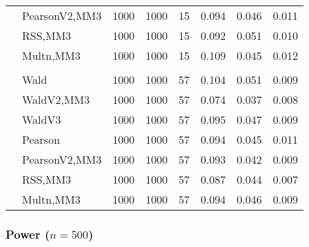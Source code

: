 \documentclass[
]{article}
\begin{document}
\begin{table}[H]
{\begin{tabular}[t]{llrrrrrr}
\hspace{1em} & PearsonV2,MM3 & 1000 & 1000 & 15 & 0.094 & 0.046 & 0.011\\

\hspace{1em} & RSS,MM3 & 1000 & 1000 & 15 & 0.092 & 0.051 & 0.010\\

\hspace{1em} & Multn,MM3 & 1000 & 1000 & 15 & 0.109 & 0.045 & 0.012\\
\cmidrule{1-8}
\addlinespace[0.3em]
\multicolumn{8}{l}{\textbf{3F 15V}}\\
\hspace{1em} & Wald & 1000 & 1000 & 57 & 0.104 & 0.051 & 0.009\\

\hspace{1em} & WaldV2,MM3 & 1000 & 1000 & 57 & 0.074 & 0.037 & 0.008\\

\hspace{1em} & WaldV3 & 1000 & 1000 & 57 & 0.095 & 0.047 & 0.009\\

\hspace{1em} & Pearson & 1000 & 1000 & 57 & 0.094 & 0.045 & 0.011\\

\hspace{1em} & PearsonV2,MM3 & 1000 & 1000 & 57 & 0.093 & 0.042 & 0.009\\

\hspace{1em} & RSS,MM3 & 1000 & 1000 & 57 & 0.087 & 0.044 & 0.007\\

\hspace{1em} & Multn,MM3 & 1000 & 1000 & 57 & 0.094 & 0.046 & 0.009\\
\bottomrule
\end{tabular}}
\end{table}

\hypertarget{power-n500}{%
\subsubsection{\texorpdfstring{Power
(\(n=500\))}{Power (n=500)}}\label{power-n500}}
\end{document}
